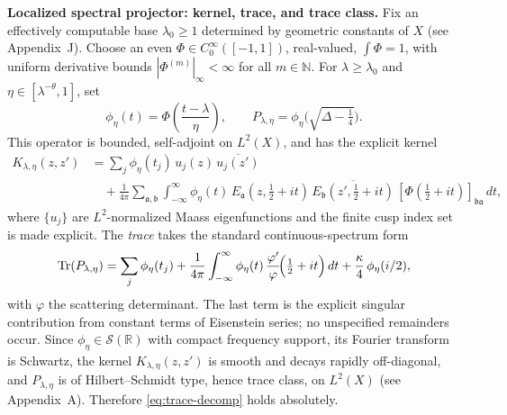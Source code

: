 \medskip
\noindent\textbf{Localized spectral projector: kernel, trace, and trace class.}
Fix an effectively computable base $\lambda_0\ge1$ determined by geometric constants of $X$ (see Appendix~J). Choose an even $\Phi\in C_0^\infty([-1,1])$, real-valued, $\int\Phi=1$, with uniform derivative bounds $|\Phi^{(m)}|_\infty<\infty$ for all $m\in\mathbb{N}$. For $\lambda\ge\lambda_0$ and $\eta\in[\lambda^{-\theta},1]$, set
\[
\phi_\eta(t)=\Phi\!\left(\frac{t-\lambda}{\eta}\right),\qquad 
P_{\lambda,\eta}=\phi_\eta\!\Big(\sqrt{\Delta-\tfrac14}\Big).
\]
This operator is bounded, self-adjoint on $L^2(X)$, and has the explicit kernel
\begin{equation}\label{eq:kernel}
\begin{aligned}
K_{\lambda,\eta}(z,z') &= 
\sum_j \phi_\eta(t_j)\,u_j(z)\,\overline{u_j(z')} \\
&\quad+ \frac{1}{4\pi}\sum_{\mathfrak{a},\mathfrak{b}}
\int_{-\infty}^{\infty} \phi_\eta(t)\,E_\mathfrak{a}(z,\tfrac12+it)\,
\overline{E_\mathfrak{b}(z',\tfrac12+it)}\,
[\Phi(\tfrac12+it)]_{\mathfrak{b}\mathfrak{a}}\,dt,
\end{aligned}
\end{equation}
where $\{u_j\}$ are $L^2$-normalized Maass eigenfunctions and the finite cusp index set is made explicit. The \emph{trace} takes the standard continuous-spectrum form
\begin{equation}\label{eq:trace-decomp}
\operatorname{Tr}(P_{\lambda,\eta}) = 
\sum_j \phi_\eta(t_j) 
+ \frac{1}{4\pi}\int_{-\infty}^{\infty} 
\phi_\eta(t)\,\frac{\varphi'}{\varphi}\!\Big(\tfrac12+it\Big)\,dt
+ \frac{\kappa}{4}\,\phi_\eta(i/2),
\end{equation}
with $\varphi$ the scattering determinant. The last term is the explicit singular contribution from constant terms of Eisenstein series; no unspecified remainders occur. Since $\phi_\eta\in\mathcal{S}(\mathbb{R})$ with compact frequency support, its Fourier transform is Schwartz, the kernel $K_{\lambda,\eta}(z,z')$ is smooth and decays rapidly off-diagonal, and $P_{\lambda,\eta}$ is of Hilbert--Schmidt type, hence trace class, on $L^2(X)$ (see Appendix~A). Therefore \eqref{eq:trace-decomp} holds absolutely.

